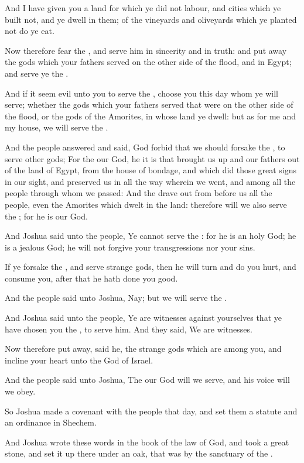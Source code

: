 \Verse And I have given you a land for which ye did not labour, and cities which ye built not, and ye dwell in them; of the vineyards and oliveyards which ye planted not do ye eat.

\Verse Now therefore fear the \LORD, and serve him in sincerity and in truth: and put away the gods which your fathers served on the other side of the flood, and in Egypt; and serve ye the \LORD.

\Verse And if it seem evil unto you to serve the \LORD, choose you this day whom ye will serve; whether the gods which your fathers served that were on the other side of the flood, or the gods of the Amorites, in whose land ye dwell: but as for me and my house, we will serve the \LORD.

\Verse And the people answered and said, God forbid that we should forsake the \LORD, to serve other gods; \Verse For the \LORD our God, he it is that brought us up and our fathers out of the land of Egypt, from the house of bondage, and which did those great signs in our sight, and preserved us in all the way wherein we went, and among all the people through whom we passed: \Verse And the \LORD drave out from before us all the people, even the Amorites which dwelt in the land: therefore will we also serve the \LORD; for he is our God.

\Verse And Joshua said unto the people, Ye cannot serve the \LORD: for he is an holy God; he is a jealous God; he will not forgive your transgressions nor your sins.

\Verse If ye forsake the \LORD, and serve strange gods, then he will turn and do you hurt, and consume you, after that he hath done you good.

\Verse And the people said unto Joshua, Nay; but we will serve the \LORD.

\Verse And Joshua said unto the people, Ye are witnesses against yourselves that ye have chosen you the \LORD, to serve him. And they said, We are witnesses.

\Verse Now therefore put away, said he, the strange gods which are among you, and incline your heart unto the \LORD God of Israel.

\Verse And the people said unto Joshua, The \LORD our God will we serve, and his voice will we obey.

\Verse So Joshua made a covenant with the people that day, and set them a statute and an ordinance in Shechem.

\Verse And Joshua wrote these words in the book of the law of God, and took a great stone, and set it up there under an oak, that was by the sanctuary of the \LORD.

